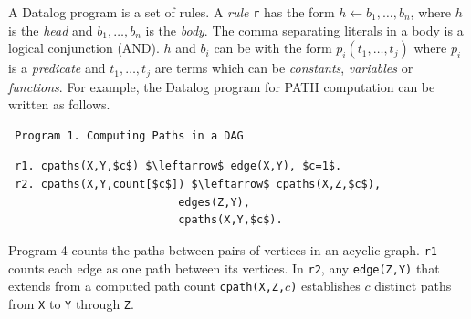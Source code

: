 A Datalog program is a set of rules. A \emph{rule} \texttt{r} has the form $h\leftarrow b_1,\ldots,b_n$, where $h$ is the \emph{head} and $b_1,\ldots,b_n$ is the \emph{body}. The comma separating literals in a body is a logical conjunction (AND). $h$ and $b_i$ can be with the form $p_i(t_1,\ldots,t_j)$ where $p_i$ is a \emph{predicate} and $t_1,\ldots,t_j$ are terms which can be \emph{constants}, \emph{variables} or \emph{functions}. For example, the Datalog program for PATH computation can be written as follows.

 \begin{verbatim}
 Program 1. Computing Paths in a DAG
 \end{verbatim}\vspace{-0.1in}\small
 \begin{lstlisting}
 r1. cpaths(X,Y,$c$) $\leftarrow$ edge(X,Y), $c=1$.
 r2. cpaths(X,Y,count[$c$]) $\leftarrow$ cpaths(X,Z,$c$),
                          edges(Z,Y),
                          cpaths(X,Y,$c$).
 \end{lstlisting}
 \normalsize
 
 Program 4 counts the paths between pairs of vertices in an acyclic graph. \texttt{r1} counts each edge as one path between its vertices. In \texttt{r2}, any \texttt{edge(Z,Y)} that extends from a computed path count \texttt{cpath(X,Z,$c$)} establishes $c$ distinct paths from \texttt{X} to \texttt{Y} through \texttt{Z}.
 

